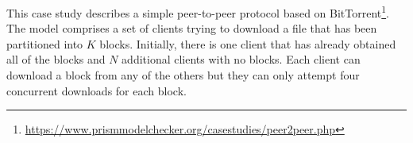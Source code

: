 \begin{comment}
\subsection{The Dice Program}
The first test case is the Dice Program \cite{KY76}, a model involving
only a single process.  The following program simulates a die using
only unbiased coins. Starting from the initial vertex (state $s_0$),
the process involves the iterative flipping of a coin. Upon obtaining
heads, the upper branch is chosen, and in the case of tails, the lower
branch is taken. This sequential process persists until the final
determination of the die's value.  In particular, the PRISM model uses
two variables: \codeprism{d} which represents the value of the dice,
ranging from 0 to 6; \codeprism{STATE} which is the state variable,
ranging from 0 to 7.  Initially, both variables are set to 0.
\vspace{-0.05cm}
 \begin{lstlisting}[style=chor-color,caption={Choreography for the Dice Program},captionpos=b,label={ex1-code}]
	{DiceProtocol0 $\coloneqq$  Dice $\rightarrow$ Dice : (+["0.5*1"] ; DiceProtocol1
						 +["0.5*1"] ;  DiceProtocol2)
	
	DiceProtocol1 $\coloneqq$ Dice $\rightarrow$ Dice : (+["0.5*1"] ; Dice $\rightarrow$ Dice : 
							(+["0.5*1"]  ; DiceProtocol1
							 +["0.5*1"]  "(d'=1)" ; DiceProtocol7)
					     +["0.5*1"] ;  Dice $\rightarrow$ Dice : 
							(+["0.5*1"]  "(d'=2)" ; DiceProtocol7
							 +["0.5*1"]  "(d'=3)" ; DiceProtocol7))
	$\ldots$
	DiceProtocol7 $\coloneqq$ Dice $\rightarrow$ Dice : (["1*1"] ; END)}
	\end{lstlisting}
   \vspace{-0.15cm}


As expected, since there is no concurrency, there are no significant improvements to the code in using choreographies.
The PRISM model produced by our method closely aligns with the original model with only minimal details that differ between the two.
Additionally, to ensure the generated program's accuracy, 
we evaluated whether the probability of reaching a state where the dice displays \texttt{d=k} for every possible \texttt{k} from 1 to 6 equals 1/6. Our simulations shown that the probabilities calculated by our generated model fully matched those from the original PRISM model. 
\end{comment}
This case study describes a simple peer-to-peer protocol based on BitTorrent\footnote{\url{https://www.prismmodelchecker.org/casestudies/peer2peer.php}}. The model comprises a set of clients trying to download a file that has been partitioned into $K$ blocks. Initially, there is one client that has already obtained all of the blocks and $N$ additional clients with no blocks. Each client can download a block from any of the others but they can only attempt four concurrent downloads for each block.\\
